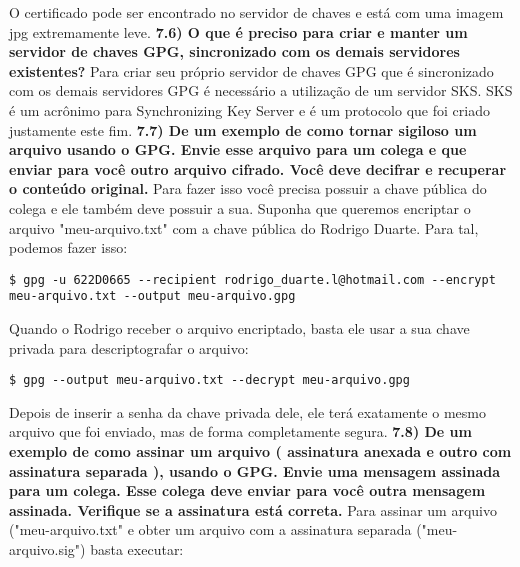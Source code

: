 \documentclass[a4paper,11pt]{article}
\theoremstyle{mytheor}
\begin{document}
O certificado pode ser encontrado no servidor de chaves e está com uma imagem jpg extremamente leve.
\newline
\newline \noindent \textbf{7.6) O que é preciso para criar e manter um servidor de chaves GPG, sincronizado com os demais servidores existentes?}\newline
Para criar seu próprio servidor de chaves GPG que é sincronizado com os demais servidores GPG é necessário a utilização de um servidor SKS. SKS é um acrônimo para Synchronizing Key Server e é um protocolo que foi criado justamente este fim.
\newline
\newline \noindent \textbf{7.7) De um exemplo de como tornar sigiloso um arquivo usando o GPG. Envie esse arquivo para um colega e que enviar para você outro arquivo cifrado. Você deve decifrar e recuperar o conteúdo original.}\newline
Para fazer isso você precisa possuir a chave pública do colega e ele também deve possuir a sua. Suponha que queremos encriptar o arquivo "meu-arquivo.txt" com a chave pública do Rodrigo Duarte. Para tal, podemos fazer isso:

\begin{lstlisting}
$ gpg -u 622D0665 --recipient rodrigo_duarte.l@hotmail.com --encrypt meu-arquivo.txt --output meu-arquivo.gpg

\end{lstlisting}

Quando o Rodrigo receber o arquivo encriptado, basta ele usar a sua chave privada para descriptografar o arquivo:

\begin{lstlisting}
$ gpg --output meu-arquivo.txt --decrypt meu-arquivo.gpg
\end{lstlisting}

Depois de inserir a senha da chave privada dele, ele terá exatamente o mesmo arquivo que foi enviado, mas de forma completamente segura.
\newline
\newline \noindent \textbf{7.8) De um exemplo de como assinar um arquivo ( assinatura anexada e outro com assinatura separada ), usando o GPG. Envie uma mensagem assinada para um colega. Esse colega deve enviar para você outra mensagem assinada. Verifique se a assinatura está correta.}\newline
Para assinar um arquivo ("meu-arquivo.txt" e obter um arquivo com a assinatura separada ("meu-arquivo.sig") basta executar:
\end{document}
